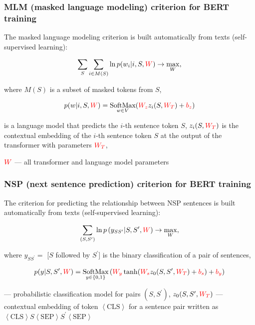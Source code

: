 \documentclass[fullscreen=true, bookmarks=true, hyperref={pdfencoding=unicode}]{beamer}
\begin{document}
\begin{frame}
  \frametitle{MLM (masked language modeling) criterion for BERT training}

  The masked language modeling criterion is built automatically from texts (self-supervised learning):

  $$ \sum\limits_{S} \sum\limits_{ i \in M(S)} \ln p(w_i|i, S, {\color{red}W}) \to \max\limits_W, $$

  where $M(S)$ is a subset of masked tokens from $S$,

  $$ p(w|i, S, {\color{red}W}) = \underset{w \in V}{\text{SoftMax}}({\color{red}W_z}z_i(S, {\color{red}W_T}) + {\color{red}b_z})$$

  is a language model that predicts the $i$-th sentence token $S$, $z_i(S, {\color{red}W_T})$ is the contextual embedding of the $i$-th sentence token $S$ at the output of the transformer with parameters ${\color{red}W_T}$,

  ${\color{red}W}$ — all transformer and language model parameters
\end{frame}


\begin{frame}
  \frametitle{NSP (next sentence prediction) criterion for BERT training}

  The criterion for predicting the relationship between NSP sentences is built automatically from texts (self-supervised learning):

  $$ \sum\limits_{(S, S^\prime)} \ln p\left(y_{SS^\prime}|S, S^\prime, {\color{red}W}\right) \to \max\limits_W, $$

  where $y_{SS^\prime} = $ [$S$ followed by $S^\prime$] is the binary classification of a pair of sentences,

  $$ p(y|S, S^\prime, {\color{red}W}) = \underset{y \in \{0,1\}}{\text{SoftMax}}\left({\color {red}W_y} \tanh({\color{red}W_s}z_0(S, S^\prime, {\color{red}W_T}) + {\color{red}b_s}) + {\color{red}b_y}\right)$$

  — probabilistic classification model for pairs $(S, S^\prime)$, $z_0(S, S^\prime, {\color{red}W_T})$ — contextual embedding of token $\left<\text{CLS}\right>$ for a sentence pair written as $\left<\text{CLS}\right> S \left<\text{SEP}\right> S^\prime \left<\text{SEP}\right>$
\end{frame}
\end{document}
